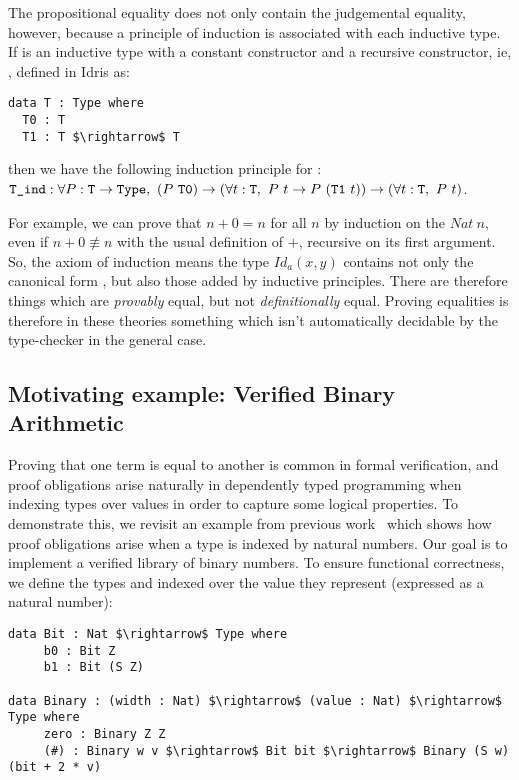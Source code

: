 The propositional equality does not only contain the judgemental equality,
however, because a principle of induction is associated with each inductive
type. If  is an inductive type with a constant constructor and a
recursive constructor, ie, , defined in Idris as: 

\begin{lstlisting}
data T : Type where
  T0 : T
  T1 : T $\rightarrow$ T          
\end{lstlisting}

then we have the following induction principle for : \\
${\mbox{\texttt{T\_ind}}} : \forall P:{\mbox{\texttt{T}}} \rightarrow {\mbox{\texttt{Type}}},\ (P\ {\mbox{\texttt{T0}}}) \rightarrow (\forall t:{\mbox{\texttt{T}}},\ P\ t \rightarrow P\ ({\mbox{\texttt{T1}}}\ t)) \rightarrow (\forall t:{\mbox{\texttt{T}}},\ P\ t)$.

For example, we can prove that $n+0 = n$ for all $n$ by induction on the $Nat\
n$, even if $n+0 \not\equiv n$ with the usual definition of $+$, recursive on
its first argument. So, the axiom of induction means the type $Id_{a}(x,y)$
contains not only the canonical form \code{Refl}, but also those added by
inductive principles.  There are therefore things which are \emph{provably}
equal, but not \emph{definitionally} equal.  Proving equalities is therefore in
these theories something which isn't automatically decidable by the
type-checker in the general case.

\subsection{Motivating example: Verified Binary Arithmetic}
\label{sect:motivatingExample}

Proving that one term is equal to another is common in formal verification, and
proof obligations arise naturally in dependently typed programming when
indexing types over values in order to capture some logical properties.
To demonstrate this,
we revisit an example from previous work~\cite{BradyTFP07} which
shows how proof obligations arise when a type is indexed by natural
numbers. Our goal is to implement a verified
library of binary numbers. To ensure functional correctness,
we define the types  and  indexed over the value they represent (expressed as a natural number):

\begin{lstlisting}
data Bit : Nat $\rightarrow$ Type where
     b0 : Bit Z
     b1 : Bit (S Z)
     
data Binary : (width : Nat) $\rightarrow$ (value : Nat) $\rightarrow$ Type where
     zero : Binary Z Z
     (#) : Binary w v $\rightarrow$ Bit bit $\rightarrow$ Binary (S w) (bit + 2 * v)
\end{lstlisting}

